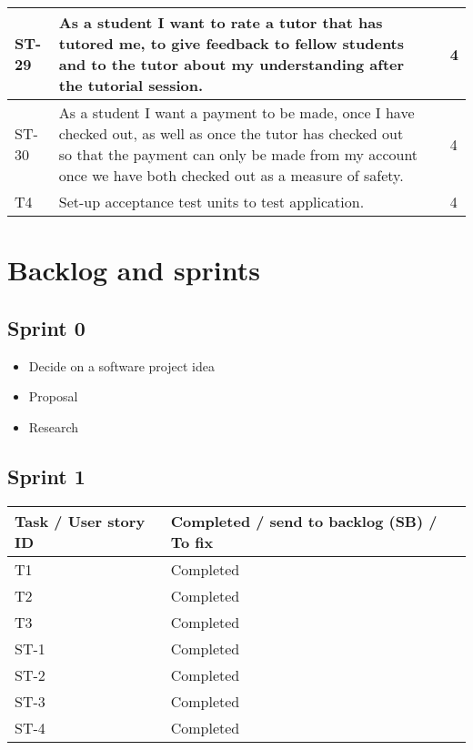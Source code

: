 \documentclass[12pt]{article}
\begin{document}
{\begin{longtable}{| p{1cm} | p{7cm}| p{5cm} | p{1cm} |}
			\\ \hline ST-29 & As a student I want to rate a tutor that has tutored me, to give feedback to fellow students and to the tutor about my understanding after the tutorial session. & &4 
			
			\\ \hline ST-30 & As a student I want a payment to be made, once I have checked out, as well as once the tutor has checked out so that the payment can only be made from my account once we have both checked out as a measure of safety.  & &4 
			
			\\ \hline T4 & Set-up acceptance test units to test application.  & &4 \\ \hline														
		

\end{longtable}
}

\newpage
\section{Backlog and sprints}
\subsection{Sprint 0}
\begin{itemize}
\item Decide on a software project idea
\item Proposal
\item Research
\end{itemize}

\subsection{Sprint 1}
{
\centering
\begin{longtable}{| p{7cm} | p{7cm}|}
			\hline			
			\textbf{Task / User story ID} & \textbf{Completed / send to backlog (SB) / To fix }
			\\ \hline 
             T1 & Completed \\ \hline
             \hline  T2 & Completed\\ \hline
             \hline  T3 & Completed\\ \hline
			 \hline  ST-1 & Completed \\ \hline
             \hline  ST-2 & Completed \\ \hline
             \hline  ST-3 & Completed \\ \hline
             \hline  ST-4 & Completed \\ \hline
            
\end{longtable}
}
\end{document}
